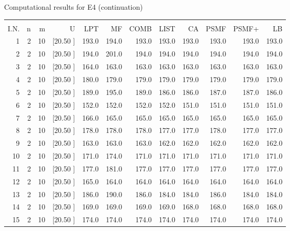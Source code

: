 \documentclass[12pt,a4paper]{article}
\begin{document}
\newpage
\begin{center}
 Computational results for E4 (continuation) {\tiny
\begin{tabular}{r r r r r r r r r r r r}\hline
    &   &   &          &        &        &        &        &        &        &        &       \\[-0.1in]
  I.N.  &  n  &  m  &  U  &  LPT  &  MF  &  COMB  &  LIST  &  CA  & PSMF &PSMF+ & LB \\[0.03in]
\hline
   1&  2& 10&[20.50     ]&   193.0&   194.0&   193.0&   193.0&   193.0&   193.0&   193.0&   193.0\\[-0.02in]
   2&  2& 10&[20.50     ]&   194.0&   201.0&   194.0&   194.0&   194.0&   194.0&   194.0&   194.0\\[-0.02in]
   3&  2& 10&[20.50     ]&   164.0&   163.0&   163.0&   163.0&   163.0&   163.0&   163.0&   163.0\\[-0.02in]
   4&  2& 10&[20.50     ]&   180.0&   179.0&   179.0&   179.0&   179.0&   179.0&   179.0&   179.0\\[-0.02in]
   5&  2& 10&[20.50     ]&   189.0&   195.0&   189.0&   186.0&   186.0&   187.0&   187.0&   186.0\\[-0.02in]
   6&  2& 10&[20.50     ]&   152.0&   152.0&   152.0&   152.0&   151.0&   151.0&   151.0&   151.0\\[-0.02in]
   7&  2& 10&[20.50     ]&   166.0&   165.0&   165.0&   165.0&   165.0&   165.0&   165.0&   165.0\\[-0.02in]
   8&  2& 10&[20.50     ]&   178.0&   178.0&   178.0&   177.0&   177.0&   178.0&   177.0&   177.0\\[-0.02in]
   9&  2& 10&[20.50     ]&   163.0&   163.0&   163.0&   162.0&   162.0&   162.0&   162.0&   162.0\\[-0.02in]
  10&  2& 10&[20.50     ]&   171.0&   174.0&   171.0&   171.0&   171.0&   171.0&   171.0&   171.0\\[-0.02in]
  11&  2& 10&[20.50     ]&   177.0&   181.0&   177.0&   177.0&   177.0&   177.0&   177.0&   177.0\\[-0.02in]
  12&  2& 10&[20.50     ]&   165.0&   164.0&   164.0&   164.0&   164.0&   164.0&   164.0&   164.0\\[-0.02in]
  13&  2& 10&[20.50     ]&   186.0&   190.0&   186.0&   184.0&   184.0&   186.0&   184.0&   184.0\\[-0.02in]
  14&  2& 10&[20.50     ]&   169.0&   169.0&   169.0&   169.0&   168.0&   168.0&   168.0&   168.0\\[-0.02in]
  15&  2& 10&[20.50     ]&   174.0&   174.0&   174.0&   174.0&   174.0&   174.0&   174.0&   174.0\\[-0.02in]

\end{tabular}}
\end{center}
\end{document}
